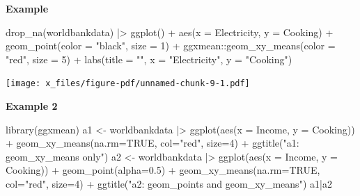 \documentclass[
  letterpaper,
  DIV=11,
  numbers=noendperiod]{scrreprt}
\newenvironment{Shaded}{\begin{snugshade}}{\end{snugshade}}
\newcommand{\AttributeTok}[1]{\textcolor[rgb]{0.40,0.45,0.13}{#1}}
\newcommand{\ConstantTok}[1]{\textcolor[rgb]{0.56,0.35,0.01}{#1}}
\newcommand{\DecValTok}[1]{\textcolor[rgb]{0.68,0.00,0.00}{#1}}
\newcommand{\FloatTok}[1]{\textcolor[rgb]{0.68,0.00,0.00}{#1}}
\newcommand{\FunctionTok}[1]{\textcolor[rgb]{0.28,0.35,0.67}{#1}}
\newcommand{\NormalTok}[1]{\textcolor[rgb]{0.00,0.23,0.31}{#1}}
\newcommand{\OtherTok}[1]{\textcolor[rgb]{0.00,0.23,0.31}{#1}}
\newcommand{\SpecialCharTok}[1]{\textcolor[rgb]{0.37,0.37,0.37}{#1}}
\newcommand{\StringTok}[1]{\textcolor[rgb]{0.13,0.47,0.30}{#1}}
\begin{document}
\textbf{Example}

\begin{Shaded}
\begin{Highlighting}[]
\FunctionTok{drop\_na}\NormalTok{(worldbankdata) }\SpecialCharTok{|\textgreater{}} 
  \FunctionTok{ggplot}\NormalTok{() }\SpecialCharTok{+}
  \FunctionTok{aes}\NormalTok{(}\AttributeTok{x =}\NormalTok{ Electricity, }\AttributeTok{y =}\NormalTok{ Cooking) }\SpecialCharTok{+}
  \FunctionTok{geom\_point}\NormalTok{(}\AttributeTok{color =} \StringTok{"black"}\NormalTok{, }\AttributeTok{size =} \DecValTok{1}\NormalTok{) }\SpecialCharTok{+} 
\NormalTok{  ggxmean}\SpecialCharTok{::}\FunctionTok{geom\_xy\_means}\NormalTok{(}\AttributeTok{color =} \StringTok{"red"}\NormalTok{, }\AttributeTok{size =} \DecValTok{5}\NormalTok{) }\SpecialCharTok{+}  
  \FunctionTok{labs}\NormalTok{(}\AttributeTok{title =} \StringTok{""}\NormalTok{, }\AttributeTok{x =} \StringTok{"Electricity"}\NormalTok{, }\AttributeTok{y =} \StringTok{"Cooking"}\NormalTok{) }
\end{Highlighting}
\end{Shaded}

\texttt{[image: x\_files/figure-pdf/unnamed-chunk-9-1.pdf]}

\textbf{Example 2}

\begin{Shaded}
\begin{Highlighting}[]
\FunctionTok{library}\NormalTok{(ggxmean)}
\NormalTok{a1 }\OtherTok{\textless{}{-}}\NormalTok{ worldbankdata }\SpecialCharTok{|\textgreater{}}
  \FunctionTok{ggplot}\NormalTok{(}\FunctionTok{aes}\NormalTok{(}\AttributeTok{x =}\NormalTok{ Income, }\AttributeTok{y =}\NormalTok{ Cooking)) }\SpecialCharTok{+} 
  \FunctionTok{geom\_xy\_means}\NormalTok{(}\AttributeTok{na.rm=}\ConstantTok{TRUE}\NormalTok{, }\AttributeTok{col=}\StringTok{"red"}\NormalTok{, }\AttributeTok{size=}\DecValTok{4}\NormalTok{) }\SpecialCharTok{+} 
  \FunctionTok{ggtitle}\NormalTok{(}\StringTok{"a1: geom\_xy\_means only"}\NormalTok{)}
\NormalTok{a2 }\OtherTok{\textless{}{-}}\NormalTok{ worldbankdata }\SpecialCharTok{|\textgreater{}}
  \FunctionTok{ggplot}\NormalTok{(}\FunctionTok{aes}\NormalTok{(}\AttributeTok{x =}\NormalTok{ Income, }\AttributeTok{y =}\NormalTok{ Cooking)) }\SpecialCharTok{+} 
  \FunctionTok{geom\_point}\NormalTok{(}\AttributeTok{alpha=}\FloatTok{0.5}\NormalTok{) }\SpecialCharTok{+}
  \FunctionTok{geom\_xy\_means}\NormalTok{(}\AttributeTok{na.rm=}\ConstantTok{TRUE}\NormalTok{, }\AttributeTok{col=}\StringTok{"red"}\NormalTok{, }\AttributeTok{size=}\DecValTok{4}\NormalTok{) }\SpecialCharTok{+} 
  \FunctionTok{ggtitle}\NormalTok{(}\StringTok{"a2: geom\_points and geom\_xy\_means"}\NormalTok{)}
\NormalTok{a1}\SpecialCharTok{|}\NormalTok{a2}
\end{Highlighting}
\end{Shaded}
\end{document}
